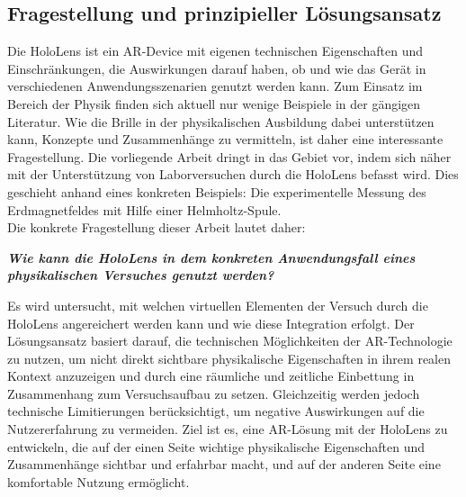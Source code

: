 \begin{comment}
 haben Augemented und Virtual Reality in den letzten Jahren an Bedeutung gewonnen.
\\
Physikalische Experimente durch virtuelle Darstellungen anzureichern und so besser und intuitiver verständlich zu machen, ist kein völlig neuer Ansatz. So stellen Strzys et. al. eine Anwendung mit der HoloLens im Bereich der Thermodynamik vor, bei der das gemessene Wärmeprofil eines erhitzten Metallstabes virtuell mit Hilfe der HoloLens auf den Stab gelegt wird \cite{Strzys17}. Und Buchau et. al. präsentieren eine Lösung, die unter anderem das Magnetfeld zweier Helmholtz-Spulen in das Echtzeitbild der Webcam zeichnet \cite{Buchau09}.\\ 
\end{comment}

\subsection{Fragestellung und prinzipieller Lösungsansatz}
\label{sec-1-2}
Die HoloLens ist ein AR-Device mit eigenen technischen Eigenschaften und Einschränkungen, die Auswirkungen darauf haben, ob und wie das Gerät in verschiedenen Anwendungsszenarien genutzt werden kann. Zum Einsatz im Bereich der Physik finden sich aktuell nur wenige Beispiele in der gängigen Literatur. Wie die Brille in der physikalischen Ausbildung dabei unterstützen kann, Konzepte und Zusammenhänge zu vermitteln, ist daher eine interessante Fragestellung. Die vorliegende Arbeit dringt in das Gebiet vor, indem sich näher mit der Unterstützung von Laborversuchen durch die HoloLens befasst wird. Dies geschieht anhand eines konkreten Beispiels: Die experimentelle Messung des Erdmagnetfeldes mit Hilfe einer Helmholtz-Spule.\\

Die konkrete Fragestellung dieser Arbeit lautet daher:
\begin{center}
	\textit{\textbf{Wie kann die HoloLens in dem konkreten Anwendungsfall eines physikalischen Versuches genutzt werden?}}
\end{center}

Es wird untersucht, mit welchen virtuellen Elementen der Versuch durch die HoloLens angereichert werden kann und wie diese Integration erfolgt. Der Lösungsansatz basiert darauf, die technischen Möglichkeiten der AR-Technologie zu nutzen, um nicht direkt sichtbare physikalische Eigenschaften in ihrem realen Kontext anzuzeigen und durch eine räumliche und zeitliche Einbettung in Zusammenhang zum Versuchsaufbau zu setzen. Gleichzeitig werden jedoch technische Limitierungen berücksichtigt, um negative Auswirkungen auf die Nutzererfahrung zu vermeiden. Ziel ist es, eine AR-Lösung mit der HoloLens zu entwickeln, die auf der einen Seite wichtige physikalische Eigenschaften und Zusammenhänge sichtbar und erfahrbar macht, und auf der anderen Seite eine komfortable Nutzung ermöglicht.

